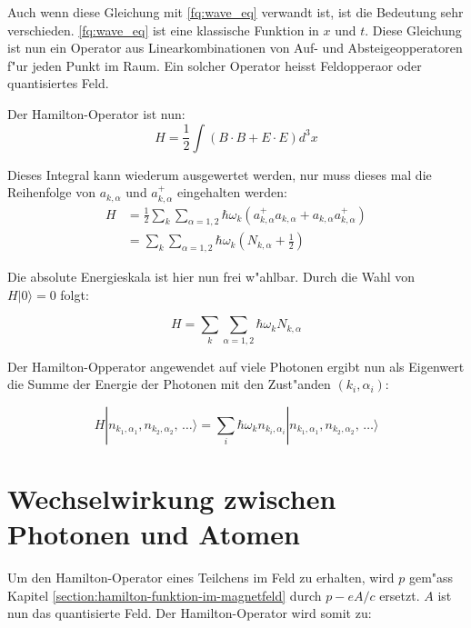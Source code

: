 Auch wenn diese Gleichung mit \ref{fq:wave_eq} verwandt ist, ist die Bedeutung sehr verschieden. \ref{fq:wave_eq} ist eine klassische Funktion in $x$ und $t$. Diese Gleichung ist nun ein Operator aus Linearkombinationen von Auf- und Absteigeopperatoren f"ur jeden Punkt im Raum. Ein solcher Operator heisst Feldopperaor oder quantisiertes Feld.

Der Hamilton-Operator ist nun:
\begin{equation}
H = \frac{1}{2} \int (B \cdot B + E \cdot E) d^3 x
\end{equation}

Dieses Integral kann wiederum ausgewertet werden, nur muss dieses mal die Reihenfolge von $a_{k,\alpha}$ und $a^+_{k,\alpha}$ eingehalten werden:
\begin{equation}
\begin{split}
H &= \frac{1}{2} \sum_k \sum_{\alpha=1,2} \hbar \omega_k (a^+_{k,\alpha} a_{k,\alpha} + a_{k,\alpha} a^+_{k,\alpha}) \\
&= \sum_k \sum_{\alpha=1,2} \hbar \omega_k (N_{k,\alpha} + \frac{1}{2} )
\end{split}
\end{equation}

Die absolute Energieskala ist hier nun frei w"ahlbar. Durch die Wahl von $H|0\rangle = 0$ folgt:

\begin{equation}
H = \sum_k \sum_{\alpha=1,2} \hbar \omega_k N_{k,\alpha}
\end{equation}

Der Hamilton-Opperator angewendet auf viele Photonen ergibt nun als Eigenwert die Summe der Energie der Photonen mit den Zust"anden $(k_i,\alpha_i)$:

\begin{equation}
H |n_{k_1,\alpha_1}, n_{k_2,\alpha_2}, \, \hdots\rangle = \sum_i \hbar \omega_k n_{k_i,\alpha_i} |n_{k_1,\alpha_1}, n_{k_2,\alpha_2}, \, \hdots\rangle
\end{equation}

\section{Wechselwirkung zwischen Photonen und Atomen}

Um den Hamilton-Operator eines Teilchens im Feld zu erhalten, wird $p$ gem"ass Kapitel \ref{section:hamilton-funktion-im-magnetfeld} durch $p -eA/c$ ersetzt. $A$ ist nun das quantisierte Feld. Der Hamilton-Operator wird somit zu:

